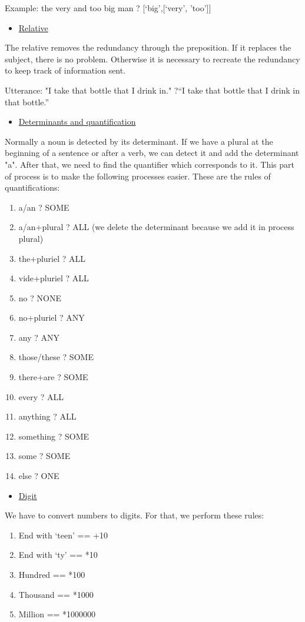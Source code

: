\documentclass[twoside,a4paper,10pt]{report}
\newcommand{\dokuunderline}[1]{\underline{#1}}
\newcommand{\dokuitem}{\item}
\begin{document}
\small
\begin{verbatimtab}
  Example: the very and too big man ? [‘big’,[‘very’, ’too’]]
\end{verbatimtab}
\normalsize

\begin{itemize}
\dokuitem  \dokuunderline{Relative}
\end{itemize}
The relative removes the redundancy through the preposition. If it replaces the subject, there is no problem. Otherwise it is necessary to recreate the redundancy to keep track of information sent. 


\small
\begin{verbatimtab}
  Utterance: "I take that bottle that I drink in."
  ?“I take that bottle that I drink in that bottle.”
\end{verbatimtab}
\normalsize

\begin{itemize}
\dokuitem  \dokuunderline{Determinants and quantification}
\end{itemize}
Normally a noun is detected by its determinant. If we have a plural at the beginning of a sentence or after a verb, we can detect it and add the determinant "a". After that, we need to find the quantifier which corresponds to it. This part of process is to make the following processes easier. These are the rules of quantifications:


\begin{enumerate}\dokuitem  a/an ? SOME
\dokuitem  a/an+plural ? ALL (we delete the determinant because we add it in process plural)
\dokuitem  the+pluriel ? ALL
\dokuitem  vide+pluriel ? ALL
\dokuitem  no ? NONE
\dokuitem  no+pluriel ? ANY
\dokuitem  any ? ANY
\dokuitem  those/these ? SOME
\dokuitem  there+are ? SOME
\dokuitem  every ? ALL
\dokuitem  anything ? ALL
\dokuitem  something ? SOME
\dokuitem  some ? SOME
\dokuitem  else ? ONE
\end{enumerate}

\begin{itemize}
\dokuitem  \dokuunderline{Digit}
\end{itemize}
We have to convert numbers to digits. For that, we perform these rules:


\begin{enumerate}\dokuitem  End with ‘teen’ == +10
\dokuitem  End with ‘ty’   == *10
\dokuitem  Hundred         == *100
\dokuitem  Thousand        == *1000
\dokuitem  Million         == *1000000
\end{enumerate}
\end{document}
